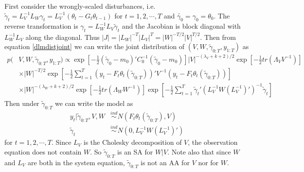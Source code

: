 \documentclass{article}
\begin{document}
First consider the wrongly-scaled disturbances, i.e. $\tilde{\gamma}_t = L_V^{-1}L_W\gamma_t= L_V^{-1}(\theta_t-G_t\theta_{t-1})$ for $t=1,2,\cdots,T$ and $\tilde{\gamma_0}=\gamma_0=\theta_0$. The reverse transformation is $\gamma_t = L_W^{-1}L_V\tilde{\gamma}_t$ and the Jacobian is block diagonal with $L_W^{-1}L_V$ along the diagonal. Thus $|J|=|L_W|^{-T}|L_V|^T=|W|^{-T/2}|V|^{T/2}$. Then from equation \eqref{dlmdistjoint} we can write the joint distribution of $(V,W,\tilde{\gamma}_{0:T},y_{1:T})$ as
 \begin{align}
  p(&V,W,\tilde{\gamma}_{0:T},y_{1:T}) \propto \exp\left[-\frac{1}{2}(\tilde{\gamma}_0-m_0)'C_0^{-1}(\tilde{\gamma}_0-m_0)\right] |V|^{-(\lambda_V + k + 2)/2}\exp\left[-\frac{1}{2}tr\left(\Lambda_VV^{-1}\right)\right] \nonumber\\
  &\times  |W|^{-T/2}\exp\left[-\frac{1}{2}\sum_{t=1}^T\left(y_t - F_t\theta_t(\tilde{\gamma}_{0:T})\right)'V^{-1}\left(y_t - F_t\theta_t(\tilde{\gamma}_{0:T})\right)\right]\nonumber\\
   & \times |W|^{-(\lambda_W + k + 2)/2}\exp\left[-\frac{1}{2}tr\left(\Lambda_WW^{-1}\right)\right] \exp\left[-\frac{1}{2}\sum_{t=1}^T\tilde{\gamma}_t'(L_V^{-1}W(L_V^{-1})')^{-1}\tilde{\gamma}_t\right]\label{dlmdisttildejoint}
 \end{align}
Then under $\tilde{\gamma}_{0:T}$ we can write the model as
\begin{align*}
  y_t|\tilde{\gamma}_{0:T},V,W & \stackrel{ind}{\sim} N\left(F_t\theta_t(\tilde{\gamma}_{0:T}), V\right)\\
  \tilde{\gamma}_t & \stackrel{ind}{\sim}N(0,L_V^{-1}W(L_V^{-1})')
\end{align*}
for $t=1,2,\cdots,T$. Since $L_V$ is the Cholesky decomposition of $V$, the observation equation does not contain $W$. So $\tilde{\gamma}_{0:T}$ is an SA for $W|V$. Note also that since $W$ and $L_V$ are both in the system equation, $\tilde{\gamma}_{0:T}$ is not an AA for $V$ nor for $W$. 
\end{document}
